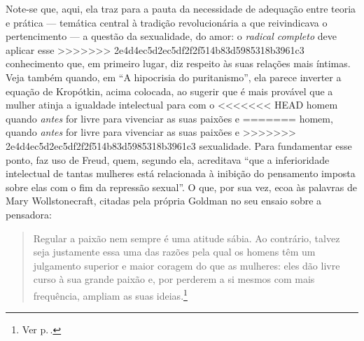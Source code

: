 {Note-se que, aqui, ela traz para a pauta da
necessidade de adequação entre teoria e prática --- temática central à
tradição revolucionária a que reivindicava o pertencimento --- a questão
da sexualidade, do amor: o \textit{radical completo} deve aplicar esse
>>>>>>> 2e4d4ec5d2ec5df2f2f514b83d5985318b3961c3
conhecimento que, em primeiro lugar, diz respeito às suas relações mais
íntimas. Veja também quando, em ``A hipocrisia do puritanismo'', ela
parece inverter a equação de Kropótkin, acima colocada, ao sugerir que é
mais provável que a mulher atinja a igualdade intelectual para com o
<<<<<<< HEAD
homem quando \emph{antes} for livre para vivenciar as suas paixões e
=======
homem, quando \textit{antes} for livre para vivenciar as suas paixões e
>>>>>>> 2e4d4ec5d2ec5df2f2f514b83d5985318b3961c3
sexualidade. Para fundamentar esse ponto, faz uso de Freud, quem,
segundo ela, acreditava ``que a inferioridade intelectual de tantas
mulheres está relacionada à inibição do pensamento imposta sobre elas
com o fim da repressão sexual''. O que, por sua vez, ecoa às palavras de
Mary Wollstonecraft, citadas pela própria Goldman no seu ensaio sobre a
pensadora:

\begin{quote}
Regular a paixão nem sempre é uma atitude sábia. Ao contrário, talvez
seja justamente essa uma das razões pela qual os homens têm um
julgamento superior e maior coragem do que as mulheres: eles dão livre
curso à sua grande paixão e, por perderem a si mesmos com mais
frequência, ampliam as suas ideias.\footnote{Ver p.\,\pageref{regular}.}
\end{quote}

}
